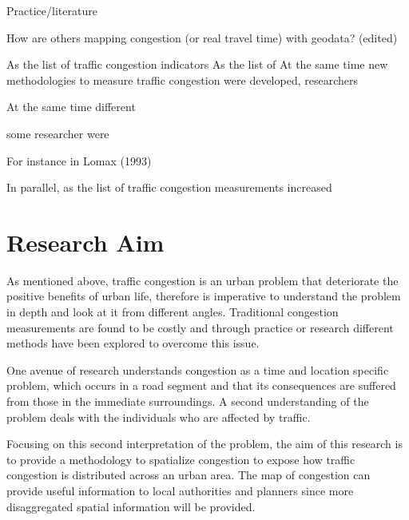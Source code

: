 \documentclass[a4paper]{jpconf}
\begin{document}
\indent Practice/literature\par


\indent How are others mapping congestion (or real travel time) with geodata? (edited) \par





\indent As the list of traffic congestion indicators
As the list of 
At the same time new methodologies to measure traffic congestion were developed, researchers 


At the same time different 

some researcher were 

For instance in Lomax (1993) 

In parallel, as the list of traffic congestion measurements increased 








\section{Research Aim}
\indent As mentioned above, traffic congestion is an urban problem that deteriorate the positive benefits of urban life, therefore is imperative to understand the problem in depth and look at it from different angles. Traditional congestion measurements are found to be costly and through practice or research different methods have been explored to overcome this issue. \par
\indent One avenue of research understands congestion as a time and location specific problem, which occurs in a road segment and that its consequences are suffered from those in the immediate surroundings. A second understanding of the problem deals with the individuals who are affected by traffic. \par
\indent Focusing on this second interpretation of the problem, the aim of this research is to provide a methodology to spatialize congestion to expose how traffic congestion is distributed across an urban area. The map of congestion can provide useful information to local authorities and planners since more disaggregated spatial information will be provided. \par
\end{document}
